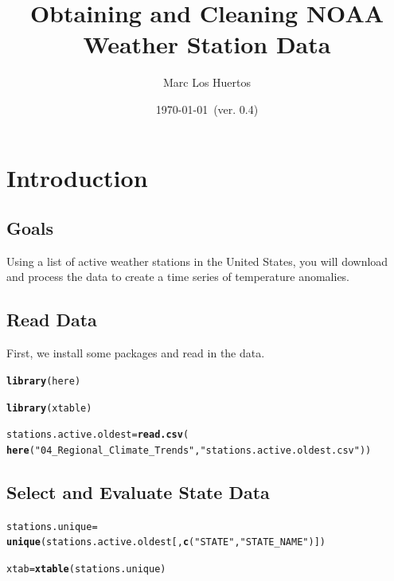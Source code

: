 \documentclass{article}\usepackage[]{graphicx}\usepackage[]{xcolor}
\title{Obtaining and Cleaning NOAA Weather Station Data}
\author{Marc Los Huertos}
\date{\today~(ver. 0.4)}
\makeatletter
\newcommand{\hlstr}[1]{\textcolor[rgb]{0.192,0.494,0.8}{#1}}%
\newcommand{\hlstd}[1]{\textcolor[rgb]{0.345,0.345,0.345}{#1}}%
\newcommand{\hlkwb}[1]{\textcolor[rgb]{0.69,0.353,0.396}{#1}}%
\newcommand{\hlkwd}[1]{\textcolor[rgb]{0.737,0.353,0.396}{\textbf{#1}}}%
\newenvironment{kframe}{%
 \def\at@end@of@kframe{}%
 \ifinner\ifhmode%
  \def\at@end@of@kframe{\end{minipage}}%
  \begin{minipage}{\columnwidth}%
 \fi\fi%
 \def\FrameCommand##1{\hskip\@totalleftmargin \hskip-\fboxsep
 \colorbox{shadecolor}{##1}\hskip-\fboxsep
     \hskip-\linewidth \hskip-\@totalleftmargin \hskip\columnwidth}%
 \MakeFramed {\advance\hsize-\width
   \@totalleftmargin\z@ \linewidth\hsize
   \@setminipage}}%
 {\par\unskip\endMakeFramed%
 \at@end@of@kframe}
\newenvironment{knitrout}{}{} %
\makeatother
\begin{document}
\maketitle

\section{Introduction}

\subsection{Goals}

Using a list of active weather stations in the United States, you  will download and process the data to create a time series of temperature anomalies. 

\subsection{Read Data}

First, we install some packages and read in the data.

\begin{knitrout}
\color{fgcolor}\begin{kframe}
\begin{alltt}
\hlkwd{library}\hlstd{(here)}
\end{alltt}


{\ttfamily\noindent\itshape\color{messagecolor}{\#\# here() starts at /home/mwl04747/RTricks}}\begin{alltt}
\hlkwd{library}\hlstd{(xtable)}

\hlstd{stations.active.oldest} \hlkwb{=} \hlkwd{read.csv}\hlstd{(}
  \hlkwd{here}\hlstd{(}\hlstr{"04_Regional_Climate_Trends"}\hlstd{,} \hlstr{"stations.active.oldest.csv"}\hlstd{))}
\end{alltt}
\end{kframe}
\end{knitrout}

\subsection{Select and Evaluate State Data}

\begin{knitrout}
\color{fgcolor}\begin{kframe}
\begin{alltt}
\hlstd{stations.unique} \hlkwb{=}
  \hlkwd{unique}\hlstd{(stations.active.oldest[,}\hlkwd{c}\hlstd{(}\hlstr{"STATE"}\hlstd{,} \hlstr{"STATE_NAME"}\hlstd{)])}

\hlstd{xtab} \hlkwb{=} \hlkwd{xtable}\hlstd{(stations.unique)}
\end{alltt}
\end{kframe}
\end{knitrout}
\end{document}

